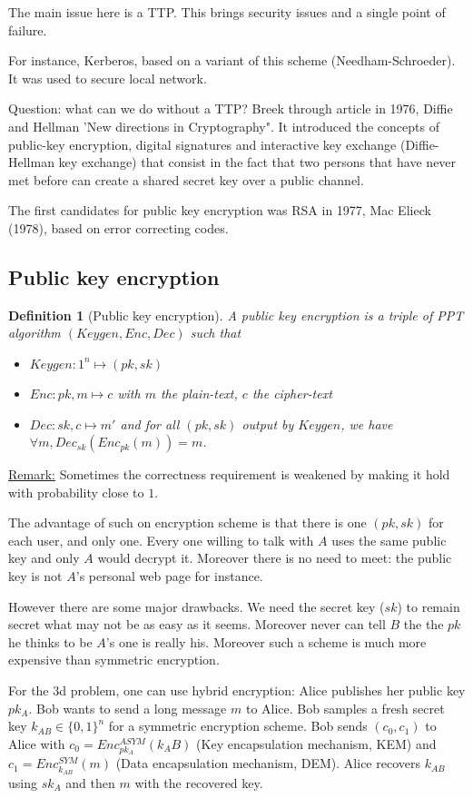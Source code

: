 \documentclass{article}
\newtheorem{defi}[thm]{Definition}
\newcommand{\Def}[3]{\begin{defi}[#1]\label{#2}#3\end{defi}}
\newcommand{\Rem}{\underline{Remark:} }
\newcommand{\bit}{\{0,1\}}
\begin{document}
The main issue here is a TTP. This brings security issues and a single point of failure.

For instance, Kerberos, based on a variant of this scheme (Needham-Schroeder). It was used to secure local network.

Question: what can we do without a TTP? Breek through article in 1976, Diffie and Hellman 'New directions in Cryptography". It introduced the concepts of public-key encryption, digital signatures and interactive key exchange (Diffie-Hellman key exchange) that consist in the fact that two persons that have never met before can create a shared secret key over a public channel.

The first candidates for public key encryption was RSA in 1977, Mac Elieck (1978), based on error correcting codes.

\subsection{Public key encryption}
\Def{Public key encryption}{}{A public key encryption is a triple of PPT algorithm $(Keygen,Enc,Dec)$ such that \begin{itemize}
\item $Keygen : 1^n \mapsto (pk,sk)$
\item $Enc : pk,m \mapsto c$ with $m$ the plain-text, $c$ the cipher-text 
\item $Dec : sk,c \mapsto m'$ and for all $(pk,sk)$ output by $Keygen$, we have $\forall m,Dec_{sk}(Enc_{pk}(m))=m$.
\end{itemize}}

\Rem Sometimes the correctness requirement is weakened by making it hold with probability close to $1$.

The advantage of such on encryption scheme is that there is one $(pk,sk)$ for each user, and only one. Every one willing to talk with $A$ uses the same public key and only $A$ would decrypt it. Moreover there is no need to meet: the public key is not $A$'s personal web page for instance.

However there are some major drawbacks. We need the secret key ($sk$) to remain secret what may not be as easy as it seems. Moreover never can tell $B$ the the $pk$ he thinks to be $A$'s one is really his. Moreover such a scheme is much more expensive than symmetric encryption.

For the 3d problem, one can use hybrid encryption:
\subitem Alice publishes her public key $pk_A$.
\subitem Bob wants to send a long message $m$ to Alice.
\subitem Bob samples a fresh secret key $k_{AB}\in\bit^n$ for a symmetric encryption scheme.
\subitem Bob sends $(c_0,c_1)$ to Alice with $c_0=Enc_{pk_A}^{ASYM}(k_AB)$ (Key encapsulation mechanism, KEM) and $c_1=Enc_{k_{AB}}^{SYM}(m)$ (Data encapsulation mechanism, DEM).
\subitem Alice recovers $k_{AB}$ using $sk_A$ and then $m$ with the recovered key.
\end{document}
